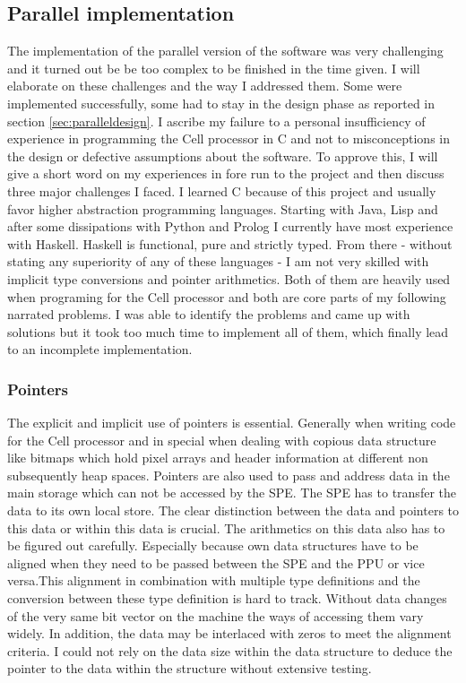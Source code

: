 \subsection{Parallel implementation}
\label{sec:par_imp}
The implementation of the parallel version of the software was very challenging and it turned out be be too complex to be finished in the time given. I will elaborate on these challenges and the way I addressed them. Some were implemented successfully, some had to stay in the design phase as reported in section \ref{sec:paralleldesign}. I ascribe my failure to a personal insufficiency of experience in programming the Cell processor in C and not to misconceptions in the design or defective assumptions about the software. To approve this, I will give a short word on my experiences in fore run to the project and then discuss three major challenges I faced.
I learned C because of this project and usually favor higher abstraction programming languages. Starting with Java, Lisp  and after some dissipations with Python and Prolog I currently have most experience with Haskell. Haskell is functional, pure and strictly typed. From there - without stating any superiority of any of these languages - I am not very skilled with implicit type conversions and pointer arithmetics. Both of them are heavily used when programing for the Cell processor and both are core parts of my following narrated problems. I was able to identify the problems and came up with solutions but it took too much time to implement all of them, which finally lead to an incomplete implementation.

\subsubsection{Pointers}
The explicit and implicit use of pointers is essential. Generally when writing code for the Cell processor and in special when dealing with copious data structure like bitmaps which hold pixel arrays and header information at different non subsequently heap spaces. Pointers are also used to pass and address data in the main storage which can not be accessed by the SPE. The SPE has to transfer the data to its own local store. The clear distinction between the data and pointers to this data or within this data is crucial. The arithmetics on this data also has to be figured out carefully. Especially because own data structures have to be aligned when they need to be passed between the SPE and the PPU or vice versa.This alignment in combination with multiple type definitions and the conversion between these type definition is hard to track. Without data changes of the very same bit vector on the machine the ways of accessing them vary widely. In addition, the data may be interlaced with zeros to meet the alignment criteria. I could not rely on the data size within the data structure to deduce the pointer to the data within the structure without extensive testing.

